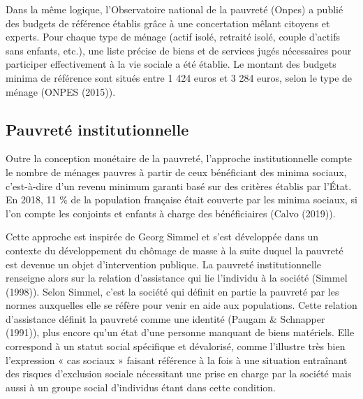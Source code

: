 \documentclass[12pt,a4paper]{reedthesis}
\begin{document}
Dans la même logique, l'Observatoire national de la pauvreté (Onpes) a publié des budgets de référence établis grâce à une concertation mêlant citoyens et experts. Pour chaque type de ménage (actif isolé, retraité isolé, couple d'actifs sans enfants, etc.), une liste précise de biens et de services jugés nécessaires pour participer effectivement à la vie sociale a été établie. Le montant des budgets minima de référence sont situés entre 1 424 euros et 3 284 euros, selon le type de ménage (ONPES (2015)).

\hypertarget{sec:institutionnelle}{%
\subsection{Pauvreté institutionnelle}\label{sec:institutionnelle}}

Outre la conception monétaire de la pauvreté, l'approche institutionnelle compte le nombre de ménages pauvres à partir de ceux bénéficiant des minima sociaux, c'est-à-dire d'un revenu minimum garanti basé sur des critères établis par l'État. En 2018, 11 \% de la population française était couverte par les minima sociaux, si l'on compte les conjoints et enfants à charge des bénéficiaires (Calvo (2019)).

Cette approche est inspirée de Georg Simmel et s'est développée dans un contexte du développement du chômage de masse à la suite duquel la pauvreté est devenue un objet d'intervention publique. La pauvreté institutionnelle renseigne alors sur la relation d'assistance qui lie l'individu à la société (Simmel (1998)). Selon Simmel, c'est la société qui définit en partie la pauvreté par les normes auxquelles elle se réfère pour venir en aide aux populations. Cette relation d'assistance définit la pauvreté comme une identité (Paugam \& Schnapper (1991)), plus encore qu'un état d'une personne manquant de biens matériels. Elle correspond à un statut social spécifique et dévalorisé, comme l'illustre très bien l'expression « cas sociaux » faisant référence à la fois à une situation entraînant des risques d'exclusion sociale nécessitant une prise en charge par la société mais aussi à un groupe social d'individus étant dans cette condition.
\end{document}
